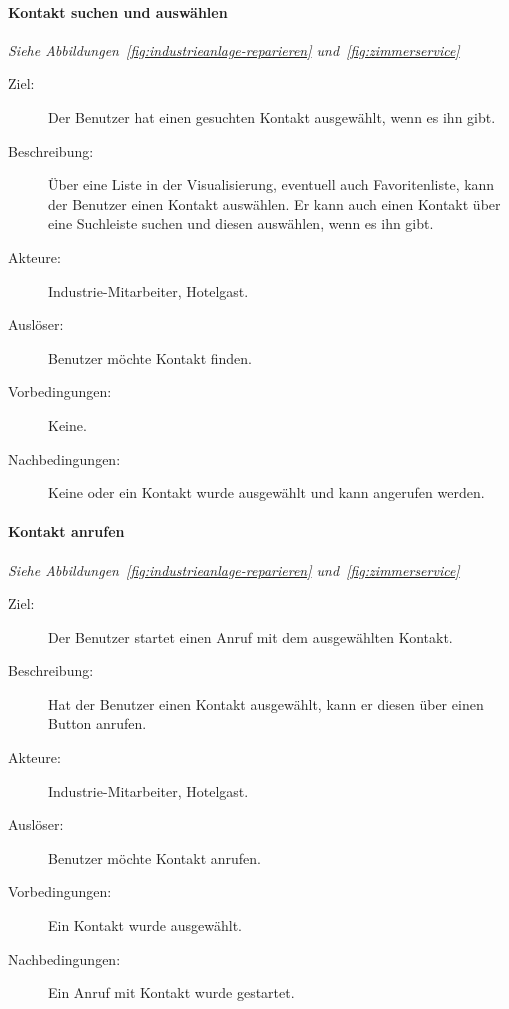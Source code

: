 \paragraph{\large{Kontakt suchen und auswählen}}
\textit{Siehe Abbildungen~\ref{fig:industrieanlage-reparieren} und~\ref{fig:zimmerservice}}
    \begin{description}
        \item[Ziel:] Der Benutzer hat einen gesuchten Kontakt ausgewählt, wenn es ihn gibt.
        \item[Beschreibung:] Über eine Liste in der Visualisierung, eventuell auch Favoritenliste, kann der Benutzer einen Kontakt auswählen.
            Er kann auch einen Kontakt über eine Suchleiste suchen und diesen auswählen, wenn es ihn gibt.
        \item[Akteure:] Industrie-Mitarbeiter, Hotelgast.
        \item[Auslöser:] Benutzer möchte Kontakt finden.
        \item[Vorbedingungen:] Keine.
        \item[Nachbedingungen:] Keine oder ein Kontakt wurde ausgewählt und kann angerufen werden.
    \end{description}

\paragraph{\large{Kontakt anrufen}}
\textit{Siehe Abbildungen~\ref{fig:industrieanlage-reparieren} und~\ref{fig:zimmerservice}}
    \begin{description}
        \item[Ziel:] Der Benutzer startet einen Anruf mit dem ausgewählten Kontakt.
        \item[Beschreibung:] Hat der Benutzer einen Kontakt ausgewählt, kann er diesen über einen Button anrufen.
        \item[Akteure:] Industrie-Mitarbeiter, Hotelgast.
        \item[Auslöser:] Benutzer möchte Kontakt anrufen.
        \item[Vorbedingungen:] Ein Kontakt wurde ausgewählt.
        \item[Nachbedingungen:] Ein Anruf mit Kontakt wurde gestartet.
    \end{description}

